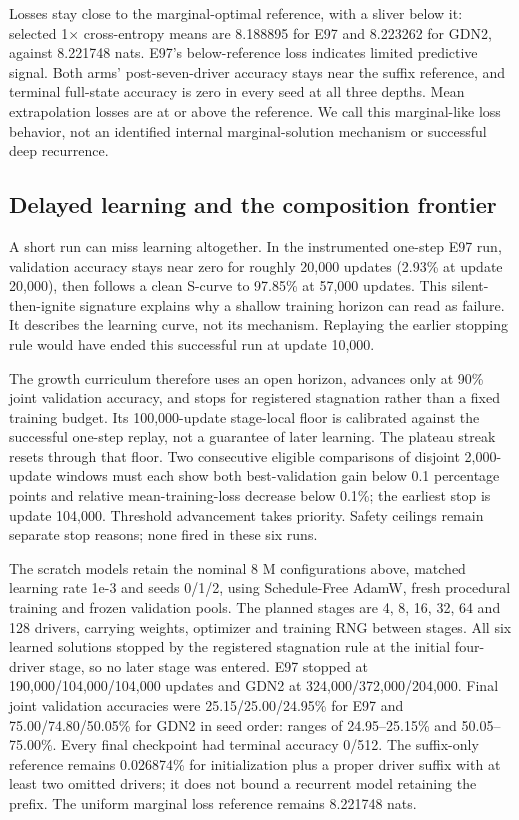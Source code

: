 \documentclass[10pt]{article}
\theoremstyle{canonical}
\theoremstyle{canonicalbullet}
\begin{document}
Losses stay close to the marginal-optimal reference, with a sliver below it: selected 1\ensuremath{\times} cross-entropy means are 8.188895 for E97 and 8.223262 for GDN2, against 8.221748 nats. E97's below-reference loss indicates limited predictive signal. Both arms' post-seven-driver accuracy stays near the suffix reference, and terminal full-state accuracy is zero in every seed at all three depths. Mean extrapolation losses are at or above the reference. We call this marginal-like loss behavior, not an identified internal marginal-solution mechanism or successful deep recurrence.


\subsection*{Delayed learning and the composition frontier}


A short run can miss learning altogether. In the instrumented one-step E97 run, validation accuracy stays near zero for roughly 20,000 updates (2.93\% at update 20,000), then follows a clean S-curve to 97.85\% at 57,000 updates. This silent-then-ignite signature explains why a shallow training horizon can read as failure. It describes the learning curve, not its mechanism. Replaying the earlier stopping rule would have ended this successful run at update 10,000.

The growth curriculum therefore uses an open horizon, advances only at 90\% joint validation accuracy, and stops for registered stagnation rather than a fixed training budget. Its 100,000-update stage-local floor is calibrated against the successful one-step replay, not a guarantee of later learning. The plateau streak resets through that floor. Two consecutive eligible comparisons of disjoint 2,000-update windows must each show both best-validation gain below 0.1 percentage points and relative mean-training-loss decrease below 0.1\%; the earliest stop is update 104,000. Threshold advancement takes priority. Safety ceilings remain separate stop reasons; none fired in these six runs.

The scratch models retain the nominal 8 M configurations above, matched learning rate 1e-3 and seeds 0/1/2, using Schedule-Free AdamW, fresh procedural training and frozen validation pools. The planned stages are 4, 8, 16, 32, 64 and 128 drivers, carrying weights, optimizer and training RNG between stages. All six learned solutions stopped by the registered stagnation rule at the initial four-driver stage, so no later stage was entered. E97 stopped at 190,000/104,000/104,000 updates and GDN2 at 324,000/372,000/204,000. Final joint validation accuracies were 25.15/25.00/24.95\% for E97 and 75.00/74.80/50.05\% for GDN2 in seed order: ranges of 24.95--25.15\% and 50.05--75.00\%. Every final checkpoint had terminal accuracy 0/512. The suffix-only reference remains 0.026874\% for initialization plus a proper driver suffix with at least two omitted drivers; it does not bound a recurrent model retaining the prefix. The uniform marginal loss reference remains 8.221748 nats.
\end{document}
